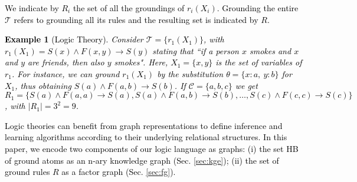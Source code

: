 \documentclass[journal]{IEEEtran}
\newtheorem{example}{Example}
\newcommand{\gm}[1]{\textcolor{cyan}{#1}}
\newcommand{\ar}[1]{\textcolor{black}{#1}}
\begin{document}
\ar{We indicate by $R_i$ the set of all the groundings of $r_i(X_i)$. Grounding the entire $\mathcal{T}$ refers to grounding all its rules and the resulting set is indicated by $R$.}
\ar{\begin{example}[Logic Theory]
\label{ex:logic_theory}
Consider $\mathcal{T}=\{r_1(X_1)\}$, with $r_1(X_1) = S(x) \land F(x,y) \rightarrow S(y)$ stating that ``if a person $x$ smokes and $x$ and $y$ are friends, then also $y$ smokes". Here, $X_1 = \{x,y\}$ is the set of variables of $r_1$. For instance, we can ground $r_1(X_1)$ by the substitution $\theta = \{x:a,\ y:b\}$ for $X_1$, thus obtaining $S(a) \land F(a,b) \rightarrow S(b)$. If $\mathcal{C}=\{a,b,c\}$ we get $R_1=\{S(a) \land F(a,a) \rightarrow S(a), S(a) \land F(a,b) \rightarrow S(b),\ldots, S(c) \land F(c,c) \rightarrow S(c)\}$, with $|R_1|=3^2=9$.
\end{example}}
\ar{Logic theories can benefit from graph representations to define inference and learning algorithms according to their underlying relational structures. In this paper, we encode two components of our logic language as graphs: (i) the set HB of ground atoms as an n-ary knowledge graph (Sec. \ref{sec:kge}); (ii) the set of ground rules $R$ as a factor graph (Sec. \ref{sec:fg}).}
\end{document}

